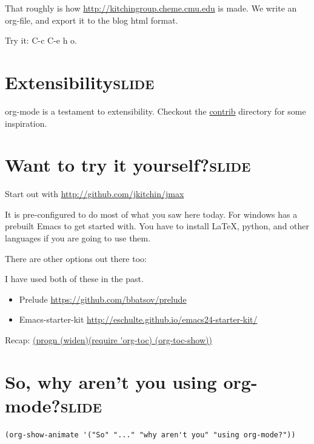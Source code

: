 \documentclass[11pt]{article}
\begin{document}
That roughly is how \url{http://kitchingroup.cheme.cmu.edu} is made. We write an org-file, and export it to the blog html format.

Try it: C-c C-e h o.

\section{Extensibility\hfill{}\textsc{slide}}
\label{sec-13}
org-mode is a testament to extensibility. Checkout the \href{./../../kitchingroup/jmax/org-mode-bleeding-edge/contrib/lisp}{contrib} directory for some inspiration.

\section{Want to try it yourself?\hfill{}\textsc{slide}}
\label{sec-14}
Start out with \url{http://github.com/jkitchin/jmax}

It is pre-configured to do most of what you saw here today. For windows has a prebuilt Emacs to get started with. You have to install \LaTeX{}, python, and other languages if you are going to use them.

There are other options out there too:

I have used both of these in the past.

\begin{itemize}
\item Prelude \url{https://github.com/bbatsov/prelude}
\item Emacs-starter-kit \url{http://eschulte.github.io/emacs24-starter-kit/}
\end{itemize}

Recap: \url{(progn (widen)(require 'org-toc) (org-toc-show))}

\section{So, why aren't you using org-mode?\hfill{}\textsc{slide}}
\label{sec-15}
\begin{verbatim}
(org-show-animate '("So" "..." "why aren't you" "using org-mode?"))
\end{verbatim}



\end{document}
